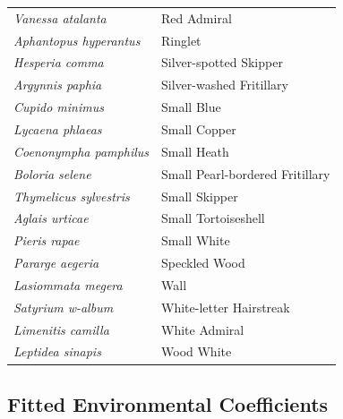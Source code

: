 \documentclass[
]{article}
\begin{document}
\begin{longtable}[]{@{}ll@{}}
\textit{Vanessa atalanta} & Red Admiral \\
\textit{Aphantopus hyperantus} & Ringlet \\
\textit{Hesperia comma} & Silver-spotted Skipper \\
\textit{Argynnis paphia} & Silver-washed Fritillary \\
\textit{Cupido minimus} & Small Blue \\
\textit{Lycaena phlaeas} & Small Copper \\
\textit{Coenonympha pamphilus} & Small Heath \\
\textit{Boloria selene} & Small Pearl-bordered Fritillary \\
\textit{Thymelicus sylvestris} & Small Skipper \\
\textit{Aglais urticae} & Small Tortoiseshell \\
\textit{Pieris rapae} & Small White \\
\textit{Pararge aegeria} & Speckled Wood \\
\textit{Lasiommata megera} & Wall \\
\textit{Satyrium w-album} & White-letter Hairstreak \\
\textit{Limenitis camilla} & White Admiral \\
\textit{Leptidea sinapis} & Wood White \\
\bottomrule()
\end{longtable}

\hypertarget{fitted-environmental-coefficients}{%
\subsection{Fitted Environmental
Coefficients}\label{fitted-environmental-coefficients}}
\end{document}
